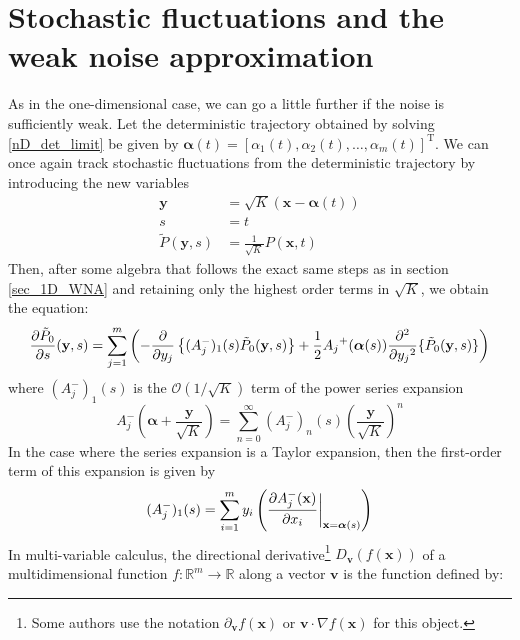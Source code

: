 \section{Stochastic fluctuations and the weak noise approximation}

As in the one-dimensional case, we can go a little further if the noise is sufficiently weak. Let the deterministic trajectory obtained by solving \eqref{nD_det_limit} be given by $\boldsymbol{\alpha}(t) = [\alpha_1(t), \alpha_2(t), \ldots, \alpha_m(t)]^{\mathrm{T}}$.  We can once again track 
stochastic fluctuations from the deterministic trajectory by introducing the new variables
\begin{equation}
\begin{aligned}
\mathbf{y} &= \sqrt{K}(\mathbf{x} - \boldsymbol{\alpha}(t))\\
s&=t\\
\tilde{P}(\mathbf{y},s) &= \frac{1}{\sqrt{K}}P(\mathbf{x},t)
\end{aligned}
\end{equation}
Then, after some algebra that follows the exact same steps as in section \ref{sec_1D_WNA} and retaining only the highest order terms in $\sqrt{K}$, we obtain the equation:
\begin{equation}
\label{nD_WNA_intermediate}
\frac{\partial \Tilde{P}_{0}}{\partial s}(\mathbf{y},s) = \sum\limits_{j=1}^{m}\left(-\frac{\partial}{\partial y_j}\left\{(A^{-}_{j})_{1}(s)\Tilde{P}_{0}(\mathbf{y},s)\right\}+\frac{1}{2}{A_j}^{+}(\boldsymbol{\alpha}(s))\frac{\partial^2}{\partial{y_j}^2}\{\Tilde{P}_{0}(\mathbf{y},s)\}\right)
\end{equation}
where $(A^{-}_{j})_{1}(s)$ is the $\mathcal{O}(1/\sqrt{K})$ term of the power series expansion
\begin{equation*}
A^-_{j}(\boldsymbol{\alpha} + \frac{\mathbf{y}}{\sqrt{K}}) = \sum\limits_{n=0}^{\infty}(A^{-}_{j})_{n}(s)\left(\frac{\mathbf{y}}{\sqrt{K}}\right)^n
\end{equation*}
In the case where the series expansion is a Taylor expansion, then the first-order term of this expansion is given by
\begin{equation}
\label{nD_WNA_taylor_term}
(A^{-}_{j})_{1}(s) = \sum\limits_{i=1}^{m} y_i\left(\frac{\partial A^{-}_j(\mathbf{x})}{\partial x_i}\bigg{|}_{\mathbf{x}=\boldsymbol{\alpha}(s)}\right)
\end{equation}
In multi-variable calculus, the directional derivative\footnote{Some authors use the notation $\partial_{\mathbf{v}}f(\mathbf{x})$ or $\mathbf{v}\cdot\nabla f(\mathbf{x})$ for this object.} $D_{\mathbf{v}}(f(\mathbf{x}))$ of a multidimensional function $f: \mathbb{R}^m \to \mathbb{R}$ along a vector $\mathbf{v}$ is the function defined by:

